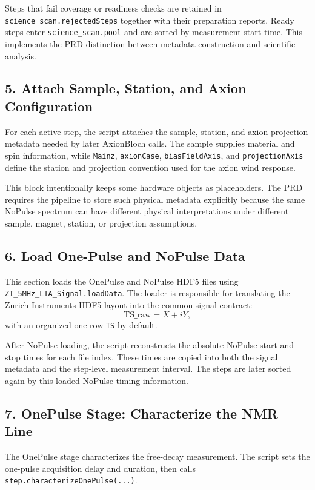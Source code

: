 \documentclass[11pt]{article}
\newcommand{\code}[1]{\texttt{#1}}
\begin{document}
Steps that fail coverage or readiness checks are retained in
\code{science\_scan.rejectedSteps} together with their preparation reports.
Ready steps enter \code{science\_scan.pool} and are sorted by measurement start
time. This implements the PRD distinction between metadata construction and
scientific analysis.

\subsection{5. Attach Sample, Station, and Axion Configuration}

For each active step, the script attaches the sample, station, and axion
projection metadata needed by later AxionBloch calls. The sample supplies
material and spin information, while \code{Mainz}, \code{axionCase},
\code{biasFieldAxis}, and \code{projectionAxis} define the station and
projection convention used for the axion wind response.

This block intentionally keeps some hardware objects as placeholders. The PRD
requires the pipeline to store such physical metadata explicitly because the
same NoPulse spectrum can have different physical interpretations under
different sample, magnet, station, or projection assumptions.

\subsection{6. Load One-Pulse and NoPulse Data}

This section loads the OnePulse and NoPulse HDF5 files using
\code{ZI\_5MHz\_LIA\_Signal.loadData}. The loader is responsible for translating
the Zurich Instruments HDF5 layout into the common signal contract:
\[
  \mathrm{TS\_raw} = X + iY,
\]
with an organized one-row \code{TS} by default.

After NoPulse loading, the script reconstructs the absolute NoPulse start and
stop times for each file index. These times are copied into both the signal
metadata and the step-level measurement interval. The steps are later sorted
again by this loaded NoPulse timing information.

\subsection{7. OnePulse Stage: Characterize the NMR Line}

The OnePulse stage characterizes the free-decay measurement. The script sets
the one-pulse acquisition delay and duration, then calls
\code{step.characterizeOnePulse(...)}.
\end{document}
